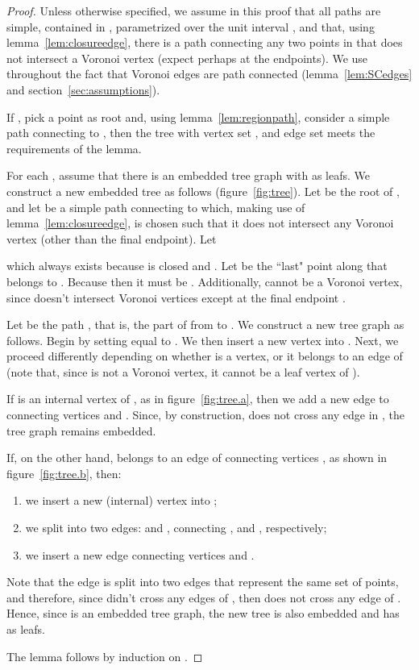 \documentclass[11pt]{article}
\begin{document}
\begin{proof}

Unless otherwise specified, we assume in this proof that all paths are simple, contained in , 
	parametrized over the unit interval , 
	and that, using lemma~\ref{lem:closureedge},
	there is a path connecting any two points in  that does not intersect a Voronoi vertex
	(expect perhaps at the endpoints). 
We use throughout the fact that Voronoi edges are path connected (lemma~\ref{lem:SCedges} and section~\ref{sec:assumptions}). 



If , pick a point  as root and, 
	using lemma~\ref{lem:regionpath},
	 consider a simple path  connecting  to , 
	then the tree with vertex set , and edge set  meets the requirements of the lemma. 





For each , assume that there is an embedded tree graph  
	with  as leafs. 
We construct a new embedded tree  as follows (figure~\ref{fig:tree}). Let  be the root of , 
	and let  be a simple path connecting  to  which, 
	making use of lemma~\ref{lem:closureedge}, is chosen such that it does not intersect 
	any Voronoi vertex (other than the final endpoint). 
Let 
	
	which always exists because  is closed 
	and . 
Let  be the ``last" point along  that belongs to .
Because  
	then it must be . 
Additionally,  cannot be a Voronoi vertex, 
	since  doesn't intersect Voronoi vertices except at the final endpoint . 



Let  be the path , 
	that is, the part of  from  to . 
We construct a new tree graph  as follows. 
Begin by setting  equal to . 
We then insert a new vertex  into . 
Next, we proceed differently depending on whether  
	is a vertex, or it belongs to an edge of 
(note that, since  is not a Voronoi vertex, it cannot be a leaf vertex of ). 




If  is an internal vertex of , 
	as in figure~\ref{fig:tree.a},
	then we add a new edge  to  connecting vertices  and . 
Since, by construction,  does not cross any edge in , the tree graph remains embedded. 



If, on the other hand,  belongs to an edge  of  connecting vertices , 
	as shown in figure~\ref{fig:tree.b}, 
	then:
	\begin{enumerate}
	\item we insert a new (internal) vertex  into ;
	\item we split  into two edges: 
		 and , connecting , and , respectively; 
	\item we insert a new edge  connecting vertices  and . 
	\end{enumerate}
Note that 
	the edge  is split into two edges that represent the same set of points, 
	and therefore, since  didn't cross any edges of , 
	then  does not cross any edge of . 
Hence, since  is an embedded tree graph, 
	the new tree  is also embedded
	 and has  as leafs. 

The lemma follows by induction on .  
\end{proof}
\end{document}
